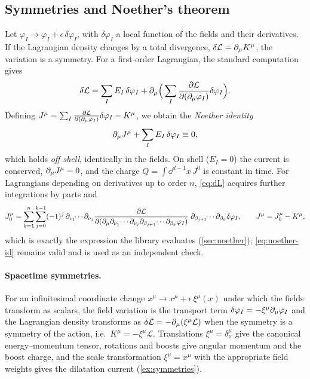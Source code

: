 \subsection{Symmetries and Noether's theorem}
\label{sec:fw-noether}

Let $\varphi_I\to\varphi_I+\epsilon\,\delta\varphi_I$, with $\delta\varphi_I$ a local function of the fields and their derivatives. If the Lagrangian density changes by a total divergence, $\delta\mathcal L=\partial_\mu K^\mu$, the variation is a symmetry. For a first-order Lagrangian, the standard computation gives
\begin{equation}
\delta\mathcal L=\sum_IE_I\,\delta\varphi_I+\partial_\mu\Big(\sum_I\frac{\partial\mathcal L}{\partial(\partial_\mu\varphi_I)}\delta\varphi_I\Big).
\label{eq:dL}
\end{equation}
Defining $J^\mu=\sum_I\frac{\partial\mathcal L}{\partial(\partial_\mu\varphi_I)}\delta\varphi_I-K^\mu$, we obtain the \emph{Noether identity}
\begin{equation}
\partial_\mu J^\mu+\sum_IE_I\,\delta\varphi_I\equiv0,
\label{eq:noether-id}
\end{equation}
which holds \emph{off shell}, identically in the fields. On shell ($E_I=0$) the current is conserved, $\partial_\mu J^\mu=0$, and the charge $Q=\int\dd^{d-1}x\,J^0$ is constant in time. For Lagrangians depending on derivatives up to order $n$, \cref{eq:dL} acquires further integrations by parts and
\begin{equation}
J_0^\mu=\sum_{k=1}^{n}\sum_{j=0}^{k-1}(-1)^j\,\partial_{\nu_1}\!\!\cdots\partial_{\nu_j}\frac{\partial\mathcal L}{\partial(\partial_\mu\partial_{\nu_1}\!\cdots\partial_{\nu_j}\partial_{\beta_{j+1}}\!\cdots\partial_{\beta_k}\varphi_I)}\;\partial_{\beta_{j+1}}\!\!\cdots\partial_{\beta_k}\delta\varphi_I,\qquad J^\mu=J_0^\mu-K^\mu,
\label{eq:Jhigher}
\end{equation}
which is exactly the expression the library evaluates (\cref{sec:noether}); \cref{eq:noether-id} remains valid and is used as an independent check.

\paragraph{Spacetime symmetries.} For an infinitesimal coordinate change $x^\mu\to x^\mu+\epsilon\,\xi^\mu(x)$ under which the fields transform as scalars, the field variation is the transport term $\delta\varphi_I=-\xi^\mu\partial_\mu\varphi_I$ and the Lagrangian density transforms as $\delta\mathcal L=-\partial_\mu(\xi^\mu\mathcal L)$ when the symmetry is a symmetry of the action, i.e.\ $K^\mu=-\xi^\mu\mathcal L$. Translations $\xi^\mu=\delta^\mu_\nu$ give the canonical energy--momentum tensor, rotations and boosts give angular momentum and the boost charge, and the scale transformation $\xi^\mu=x^\mu$ with the appropriate field weights gives the dilatation current (\cref{ex:symmetries}).


